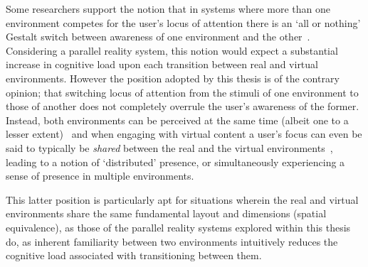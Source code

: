 

Some researchers support the notion that in systems where more than one environment competes for the user's locus of attention there is an `all or nothing' Gestalt switch between awareness of one environment and the other~\cite{Slater2002}. Considering a parallel reality system, this notion would expect a substantial increase in cognitive load upon each transition between real and virtual environments. However the position adopted by this thesis is of the contrary opinion; that switching locus of attention from the stimuli of one environment to those of another does not completely overrule the user's awareness of the former. Instead, both environments can be perceived at the same time (albeit one to a lesser extent)~\cite{Ijsselsteijn2001} and when engaging with virtual content a user's focus can even be said to typically be \textit{shared} between the real and the virtual environments~\cite{Waterworth2001}, leading to a notion of `distributed' presence, or simultaneously experiencing a sense of presence in multiple environments.

This latter position is particularly apt for situations wherein the real and virtual environments share the same fundamental layout and dimensions (spatial equivalence), as those of the parallel reality systems explored within this thesis do, as inherent familiarity between two environments intuitively reduces the cognitive load associated with transitioning between them.


